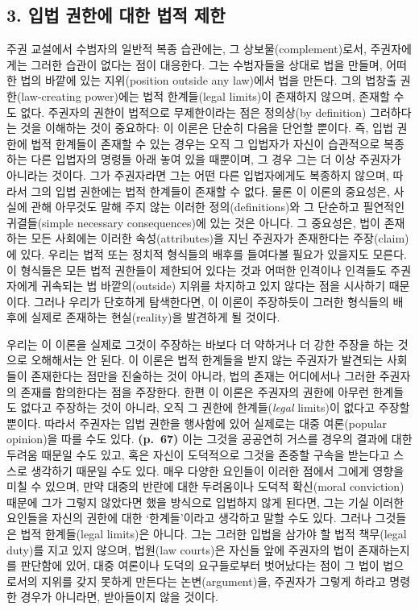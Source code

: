 \subsection{3. 입법 권한에 대한 법적
제한}\label{uxc785uxbc95-uxad8cuxd55cuxc5d0-uxb300uxd55c-uxbc95uxc801-uxc81cuxd55c}

주권 교설에서 수범자의 일반적 복종 습관에는, 그 상보물(complement)로서,
주권자에게는 그러한 습관이 없다는 점이 대응한다. 그는 수범자들을 상대로
법을 만들며, 어떠한 법의 바깥에 있는 지위(position outside any law)에서
법을 만든다. 그의 법창출 권한(law-creating power)에는 법적 한계들(legal
limits)이 존재하지 않으며, 존재할 수도 없다. 주권자의 권한이 법적으로
무제한이라는 점은 정의상(by definition) 그러하다는 것을 이해하는 것이
중요하다: 이 이론은 단순히 다음을 단언할 뿐이다. 즉, 입법 권한에 법적
한계들이 존재할 수 있는 경우는 오직 그 입법자가 자신이 습관적으로
복종하는 다른 입법자의 명령들 아래 놓여 있을 때뿐이며, 그 경우 그는 더
이상 주권자가 아니라는 것이다. 그가 주권자라면 그는 어떤 다른
입법자에게도 복종하지 않으며, 따라서 그의 입법 권한에는 법적 한계들이
존재할 수 없다. 물론 이 이론의 중요성은, 사실에 관해 아무것도 말해 주지
않는 이러한 정의(definitions)와 그 단순하고 필연적인 귀결들(simple
necessary consequences)에 있는 것은 아니다. 그 중요성은, 법이 존재하는
모든 사회에는 이러한 속성(attributes)을 지닌 주권자가 존재한다는
주장(claim)에 있다. 우리는 법적 또는 정치적 형식들의 배후를 들여다볼
필요가 있을지도 모른다. 이 형식들은 모든 법적 권한들이 제한되어 있다는
것과 어떠한 인격이나 인격들도 주권자에게 귀속되는 법 바깥의(outside)
지위를 차지하고 있지 않다는 점을 시사하기 때문이다. 그러나 우리가
단호하게 탐색한다면, 이 이론이 주장하듯이 그러한 형식들의 배후에 실제로
존재하는 현실(reality)을 발견하게 될 것이다.

우리는 이 이론을 실제로 그것이 주장하는 바보다 더 약하거나 더 강한
주장을 하는 것으로 오해해서는 안 된다. 이 이론은 법적 한계들을 받지 않는
주권자가 발견되는  사회들이 존재한다는 점만을 진술하는
것이 아니라, 법의 존재는 어디에서나 그러한 주권자의 존재를 함의한다는
점을 주장한다. 한편 이 이론은 주권자의 권한에 아무런 한계들도 없다고
주장하는 것이 아니라, 오직 그 권한에  한계들(\emph{legal}
limits)이 없다고 주장할 뿐이다. 따라서 주권자는 입법 권한을 행사함에
있어 실제로는 대중 여론(popular opinion)을 따를 수도 있다.
\textbf{(p.~67)} 이는 그것을 공공연히 거스를 경우의 결과에 대한 두려움
때문일 수도 있고, 혹은 자신이 도덕적으로 그것을 존중할 구속을 받는다고
스스로 생각하기 때문일 수도 있다. 매우 다양한 요인들이 이러한 점에서
그에게 영향을 미칠 수 있으며, 만약 대중의 반란에 대한 두려움이나 도덕적
확신(moral conviction) 때문에 그가 그렇지 않았다면 했을 방식으로
입법하지 않게 된다면, 그는 기실 이러한 요인들을 자신의 권한에 대한
‘한계들’이라고 생각하고 말할 수도 있다. 그러나 그것들은 법적
한계들(legal limits)은 아니다. 그는 그러한 입법을 삼가야 할 법적
책무(legal duty)를 지고 있지 않으며, 법원(law courts)은 자신들 앞에
주권자의 법이 존재하는지를 판단함에 있어, 대중 여론이나 도덕의
요구들로부터 벗어났다는 점이 그 법이 법으로서의 지위를 갖지 못하게
만든다는 논변(argument)을, 주권자가 그렇게 하라고 명령한 경우가
아니라면, 받아들이지 않을 것이다.

